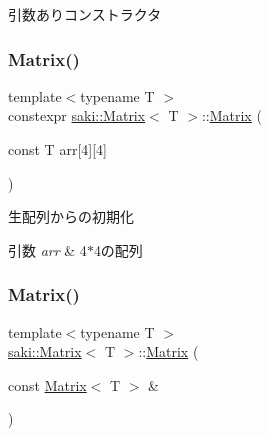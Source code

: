 引数ありコンストラクタ 

\mbox{\label{classsaki_1_1_matrix_a945fec9cbcb1b175ac993db6a5c0cbd8}} 
\subsubsection{\texorpdfstring{Matrix()}{Matrix()}\hspace{0.1cm}{\footnotesize\ttfamily [3/5]}}
{\footnotesize\ttfamily template$<$typename T $>$ \\
constexpr \mbox{\hyperlink{classsaki_1_1_matrix}{saki\+::\+Matrix}}$<$ T $>$\+::\mbox{\hyperlink{classsaki_1_1_matrix}{Matrix}} (\begin{DoxyParamCaption}\item[{const T}]{arr\mbox{[}4\mbox{]}\mbox{[}4\mbox{]} }\end{DoxyParamCaption})\hspace{0.3cm}{\ttfamily [inline]}}



生配列からの初期化 


\begin{DoxyParams}{引数}
{\em arr} & 4$\ast$4の配列 \\
\hline
\end{DoxyParams}
\mbox{\label{classsaki_1_1_matrix_a08d28bd14af9be6650325574a20101d7}} 
\subsubsection{\texorpdfstring{Matrix()}{Matrix()}\hspace{0.1cm}{\footnotesize\ttfamily [4/5]}}
{\footnotesize\ttfamily template$<$typename T $>$ \\
\mbox{\hyperlink{classsaki_1_1_matrix}{saki\+::\+Matrix}}$<$ T $>$\+::\mbox{\hyperlink{classsaki_1_1_matrix}{Matrix}} (\begin{DoxyParamCaption}\item[{const \mbox{\hyperlink{classsaki_1_1_matrix}{Matrix}}$<$ T $>$ \&}]{ }\end{DoxyParamCaption})\hspace{0.3cm}{\ttfamily [default]}}

